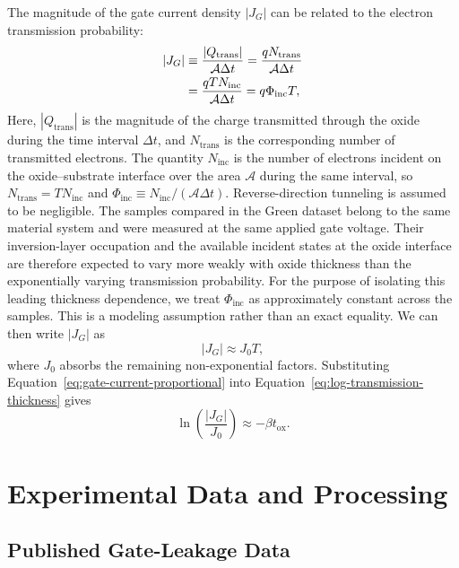 \documentclass[12pt]{article}
\begin{document}
The magnitude of the gate current density \(\left|J_G\right|\) can be related to the electron transmission probability:
\begin{align}
    \left|J_G\right|
    &\equiv \frac{\left|Q_{\mathrm{trans}}\right|}{\mathcal{A}\Delta t}
    =\frac{qN_{\mathrm{trans}}}{\mathcal{A}\Delta t}
    \notag\\
    &=\frac{qTN_{\mathrm{inc}}}{\mathcal{A}\Delta t}
    =q\Phi_{\mathrm{inc}}T,
    \label{eq:gate-current-flux}
\end{align}
Here, \(\left|Q_{\mathrm{trans}}\right|\) is the magnitude of the charge transmitted through the oxide during the time interval \(\Delta t\), and \(N_{\mathrm{trans}}\) is the corresponding number of transmitted electrons. The quantity \(N_{\mathrm{inc}}\) is the number of electrons incident on the oxide--substrate interface over the area \(\mathcal{A}\) during the same interval, so \(N_{\mathrm{trans}}=TN_{\mathrm{inc}}\) and \(\Phi_{\mathrm{inc}}\equiv N_{\mathrm{inc}}/(\mathcal{A}\Delta t)\). Reverse-direction tunneling is assumed to be negligible. The samples compared in the Green dataset belong to the same material system and were measured at the same applied gate voltage. Their inversion-layer occupation and the available incident states at the oxide interface are therefore expected to vary more weakly with oxide thickness than the exponentially varying transmission probability. For the purpose of isolating this leading thickness dependence, we treat \(\Phi_{\mathrm{inc}}\) as approximately constant across the samples. This is a modeling assumption rather than an exact equality. We can then write \(\left|J_G\right|\) as
\begin{equation}
    \left|J_G\right|\approx J_0T,
    \label{eq:gate-current-proportional}
\end{equation}
where \(J_0\) absorbs the remaining non-exponential factors. Substituting Equation~\eqref{eq:gate-current-proportional} into Equation~\eqref{eq:log-transmission-thickness} gives
\begin{equation}
    \ln \left(\frac{\left|J_G\right|}{J_0}\right)\approx-\beta t_{\mathrm{ox}}.
    \label{eq:log-gate-current-thickness}
\end{equation}

\section{Experimental Data and Processing}

\subsection{Published Gate-Leakage Data}
\end{document}
